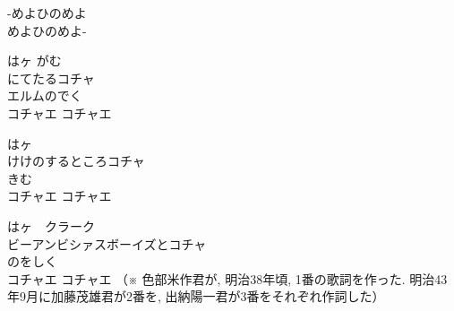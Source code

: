 \documentclass[10pt,b5j]{tarticle} %
\begin{document}
\vspace{1.5em} %
\newcommand{\linespace}{0.5em} %
\newcommand{\blocksize}{0.5\hsize} %
\begin{enumerate} %
    \begin{minipage}[c]{\blocksize}
    
        \vspace{\linespace}
        \item
        -めよひのめよ\\
        めよひのめよ-
        
        \vspace{\linespace}
        \item
        はヶ がむ\\
        にてたるコチャ\\
        エルムのでく\\
        コチャエ コチャエ
        
        \vspace{\linespace}
        \item
        はヶ　\\
        けけのするところコチャ\\
        きむ\\
        コチャエ コチャエ
        
        \vspace{\linespace}
        \item
        はヶ　クラーク\\
        ビーアンビシァスボーイズとコチャ\\
        のをしく\\
        コチャエ コチャエ
        （※
        色部米作君が, 明治38年頃, 
        1番の歌詞を作った. 
        明治43年9月に加藤茂雄君が2番を, 
        出納陽一君が3番をそれぞれ作詞した）
    
    \end{minipage}
\end{enumerate} %
\end{document}

